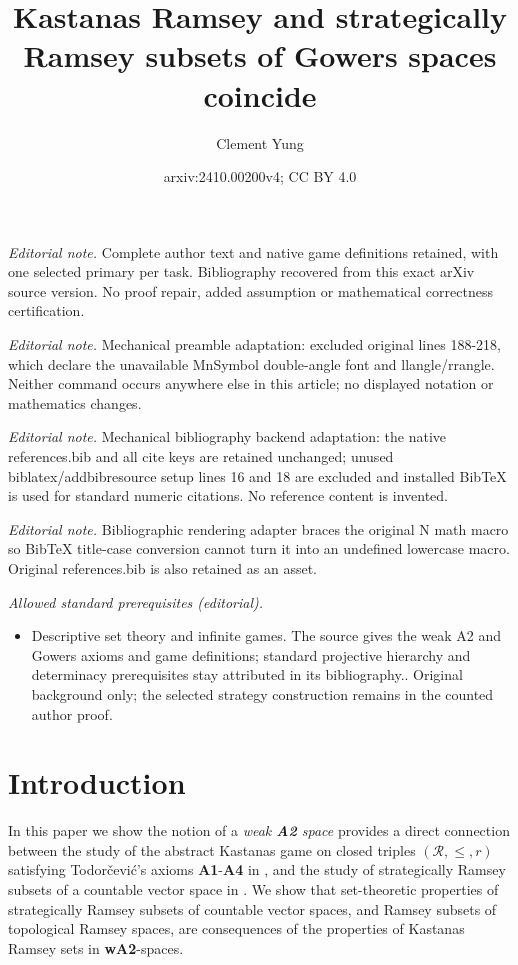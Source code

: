 \documentclass[11pt,reqno]{amsart}
\title{Kastanas Ramsey and strategically Ramsey subsets of Gowers spaces coincide}
\author{Clement Yung}
\date{arxiv:2410.00200v4; CC BY 4.0}
\theoremstyle{plain}
\numberwithin{equation}{section}
\theoremstyle{definition}
\newcommand{\cal}{\mathcal}
\begin{document}
\maketitle
\noindent\textit{Editorial note.} Complete author text and native game definitions retained, with one selected primary per task. Bibliography recovered from this exact arXiv source version. No proof repair, added assumption or mathematical correctness certification.\par\medskip
\noindent\textit{Editorial note.} Mechanical preamble adaptation: excluded original lines 188-218, which declare the unavailable MnSymbol double-angle font and llangle/rrangle. Neither command occurs anywhere else in this article; no displayed notation or mathematics changes.\par\medskip
\noindent\textit{Editorial note.} Mechanical bibliography backend adaptation: the native references.bib and all cite keys are retained unchanged; unused biblatex/addbibresource setup lines 16 and 18 are excluded and installed BibTeX is used for standard numeric citations. No reference content is invented.\par\medskip
\noindent\textit{Editorial note.} Bibliographic rendering adapter braces the original N math macro so BibTeX title-case conversion cannot turn it into an undefined lowercase macro. Original references.bib is also retained as an asset.\par\medskip
\noindent\textit{Allowed standard prerequisites (editorial).}\begin{itemize}
\item Descriptive set theory and infinite games. The source gives the weak A2 and Gowers axioms and game definitions; standard projective hierarchy and determinacy prerequisites stay attributed in its bibliography.. Original background only; the selected strategy construction remains in the counted author proof.
\end{itemize}\medskip
\section{Introduction}
In this paper we show the notion of a \emph{weak \textbf{A2} space} provides a direct connection between the study of the abstract Kastanas game on closed triples $(\cal{R},\leq,r)$ satisfying Todor\v{c}evi\'{c}'s axioms \textbf{A1}-\textbf{A4} in \cite{CD23}, and the study of strategically Ramsey subsets of a countable vector space in \cite{R08}. We show that set-theoretic properties of strategically Ramsey subsets of countable vector spaces, and Ramsey subsets of topological Ramsey spaces, are consequences of the properties of Kastanas Ramsey sets in \textbf{wA2}-spaces. 
\end{document}
